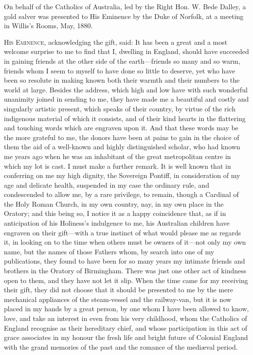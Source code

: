 
On behalf of the Catholics of
Australia, led by the Right Hon. W. Bede Dalley, a gold salver was
presented to His Eminence by the Duke of Norfolk, at a meeting in
Willis's Rooms, May, 1880.

H\textsc{is} E\textsc{minence},
acknowledging the gift, said: It has been a great and a most welcome
surprise to me to find that I, dwelling in England, should have
succeeded in gaining friends at the other side of the earth—friends
so many and so warm, friends whom I seem to myself to have done so
little to deserve, yet who have been so resolute in making known both
their warmth and their numbers to the world at large. Besides the
address, which high and low have with such wonderful unanimity joined
in sending to me, they have made me a beautiful and costly and
singularly artistic present, which speaks of their country, by virtue
of the rich indigenous material of which it consists, and of their
kind hearts in the flattering and touching words which are engraven
upon it. And that these words may be the more grateful to me, the
donors have been at pains to gain in the choice of them the aid of a
well-known and highly distinguished scholar, who had known me years
ago when he was an inhabitant of the great metropolitan centre in
which my lot is cast. I must make a further remark. It is well known
that in conferring on me my high dignity, the Sovereign Pontiff, in
consideration of my age and delicate health, suspended in my case the
ordinary rule, and condescended to allow me, by a rare privilege, to
remain, though a Cardinal of the Holy Roman Church, in my own country,
nay, in my own place in the Oratory; and this being so, I notice it as
a happy coincidence that, as if in anticipation of his Holiness's
indulgence to me, his Australian children have engraven on their
gift—with a true instinct of what would please me as regards it, in
looking on to the time when others must be owners of it—not only my
own name, but the names of those Fathers whom, by search into one of
my publications, they found to have been for so many years my intimate
friends and brothers in the Oratory of Birmingham. There was just one
other act of kindness open to them, and they have not let it slip.
When the time came for my receiving their gift, they did not choose
that it should be presented to me by the mere mechanical appliances of
the steam-vessel and the railway-van, but it is now placed in my hands
by a great person, by one whom I have been allowed to know, love, and
take an interest in even from his very childhood, whom the Catholics
of England recognise as their hereditary chief, and whose
participation in this act of grace associates in my honour the fresh
life and bright future of Colonial England with the grand memories of
the past and the romance of the mediæval period.

